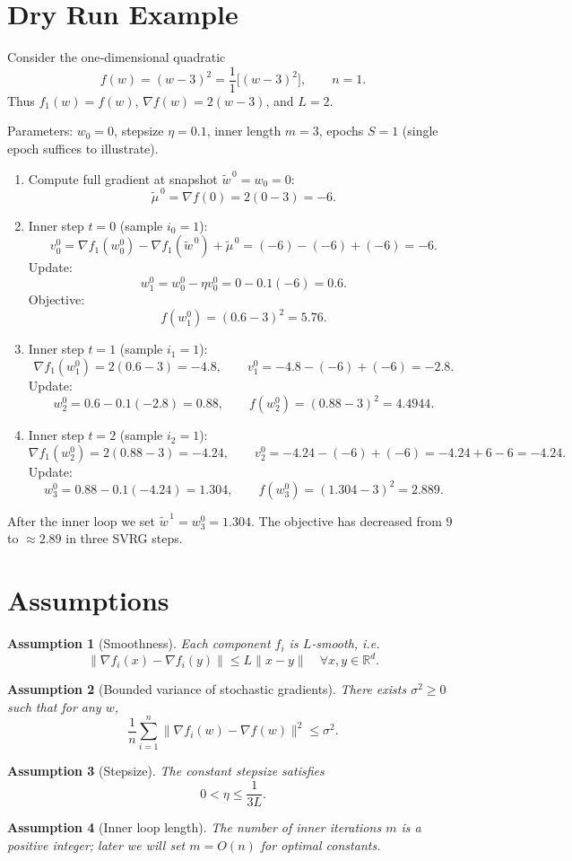 \documentclass{article}
\newtheorem{assumption}{Assumption}
\begin{document}
\section*{Dry Run Example}
Consider the one‑dimensional quadratic 
\[
f(w)=(w-3)^2=\frac{1}{1}\bigl[(w-3)^2\bigr],\qquad n=1.
\]
Thus $f_1(w)=f(w)$, $\nabla f(w)=2(w-3)$, and $L=2$.

Parameters: $w_0=0$, stepsize $\eta=0.1$, inner length $m=3$, epochs $S=1$ (single epoch suffices to illustrate).

\begin{enumerate}[label=Step \arabic*:, leftmargin=*]
\item Compute full gradient at snapshot $\tilde w^{\,0}=w_0=0$:
\[
\tilde\mu^{\,0}= \nabla f(0)=2(0-3)=-6.
\]
\item Inner step $t=0$ (sample $i_0=1$):
\[
v_0^{0}= \nabla f_{1}(w_0^{0})-\nabla f_{1}(\tilde w^{\,0})+\tilde\mu^{\,0}
        = (-6)-(-6)+(-6)=-6.
\]
Update:
\[
w_{1}^{0}= w_{0}^{0}-\eta v_0^{0}=0-0.1(-6)=0.6.
\]
Objective:
\[
f(w_{1}^{0})=(0.6-3)^2=5.76.
\]

\item Inner step $t=1$ (sample $i_1=1$):
\[
\nabla f_{1}(w_{1}^{0})=2(0.6-3)=-4.8,\qquad
v_1^{0}= -4.8-(-6)+(-6)= -2.8.
\]
Update:
\[
w_{2}^{0}=0.6-0.1(-2.8)=0.88,\qquad
f(w_{2}^{0})=(0.88-3)^2=4.4944.
\]

\item Inner step $t=2$ (sample $i_2=1$):
\[
\nabla f_{1}(w_{2}^{0})=2(0.88-3)=-4.24,\qquad
v_2^{0}= -4.24-(-6)+(-6)= -4.24+6-6=-4.24.
\]
Update:
\[
w_{3}^{0}=0.88-0.1(-4.24)=1.304,\qquad
f(w_{3}^{0})=(1.304-3)^2=2.889.
\]
\end{enumerate}
After the inner loop we set $\tilde w^{\,1}=w_{3}^{0}=1.304$.  The objective has decreased from $9$ to $\approx2.89$ in three SVRG steps.

\section*{Assumptions}
\begin{assumption}[Smoothness]\label{ass:smooth}
Each component $f_i$ is $L$‑smooth, i.e.
\[
\|\nabla f_i(x)-\nabla f_i(y)\|\le L\|x-y\|\quad\forall x,y\in\mathbb{R}^d .
\]
\end{assumption}
\begin{assumption}[Bounded variance of stochastic gradients]\label{ass:var}
There exists $\sigma^{2}\ge0$ such that for any $w$,
\[
\frac{1}{n}\sum_{i=1}^{n}\|\nabla f_i(w)-\nabla f(w)\|^{2}\le\sigma^{2}.
\]
\end{assumption}
\begin{assumption}[Stepsize]\label{ass:stepsize}
The constant stepsize satisfies
\[
0<\eta\le\frac{1}{3L}.
\]
\end{assumption}
\begin{assumption}[Inner loop length]\label{ass:m}
The number of inner iterations $m$ is a positive integer; later we will set $m=O(n)$ for optimal constants.
\end{assumption}
\end{document}
